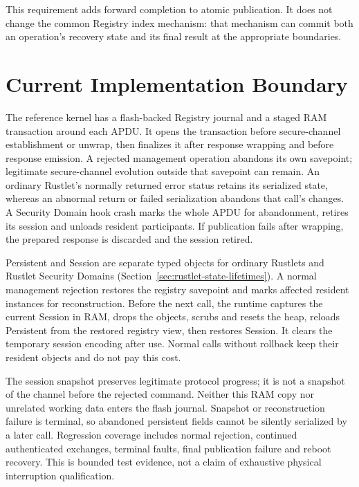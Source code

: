 This requirement adds forward completion to atomic publication. It does not
change the common Registry index mechanism: that mechanism can commit both
an operation's recovery state and its final result at the appropriate
boundaries.

\section{Current Implementation Boundary}
\label{sec:registry-current-limits}

The reference kernel has a flash-backed Registry journal and a staged RAM
transaction around each APDU. It opens the transaction before secure-channel
establishment or unwrap, then finalizes it after response wrapping and before
response emission. A rejected management operation abandons its own savepoint;
legitimate secure-channel evolution outside that savepoint can remain. An
ordinary Rustlet's normally returned error status retains its serialized
state, whereas an abnormal return or failed serialization abandons that call's
changes. A Security Domain hook crash marks the whole APDU for abandonment,
retires its session and unloads resident participants. If publication fails
after wrapping, the prepared response is discarded and the session retired.

Persistent and Session are separate typed objects for ordinary Rustlets and
Rustlet Security Domains (Section~\ref{sec:rustlet-state-lifetimes}). A normal
management rejection restores the registry savepoint and marks affected
resident instances for reconstruction. Before the next call, the runtime
captures the current Session in RAM, drops the objects, scrubs and resets the
heap, reloads Persistent from the restored registry view, then restores
Session. It clears the temporary session encoding after use. Normal calls
without rollback keep their resident objects and do not pay this cost.

The session snapshot preserves legitimate protocol progress; it is not a
snapshot of the channel before the rejected command. Neither this RAM copy
nor unrelated working data enters the flash journal. Snapshot or
reconstruction failure is terminal, so abandoned persistent fields cannot be
silently serialized by a later call. Regression coverage includes normal
rejection, continued authenticated exchanges, terminal faults, final
publication failure and reboot recovery. This is bounded test evidence,
not a claim of exhaustive physical interruption qualification.

